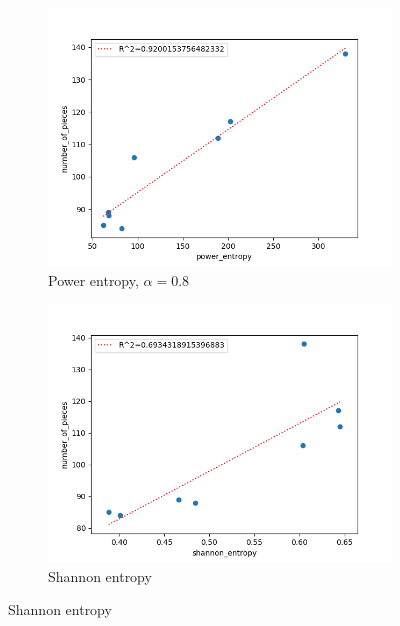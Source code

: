 \documentclass{mgggarticle}
\begin{document}
\begin{figure}
\begin{subfigure}{0.4\textwidth}
\centering
\includegraphics[width=\textwidth]{figs/scatters/pent.png}
\caption{Power entropy, $\alpha = 0.8$}
\end{subfigure}
\begin{subfigure}{0.4\textwidth}
\centering
\includegraphics[width=\textwidth]{figs/scatters/shent.png}
\caption{Shannon entropy}
\end{subfigure}


\end{figure}
\end{document}
